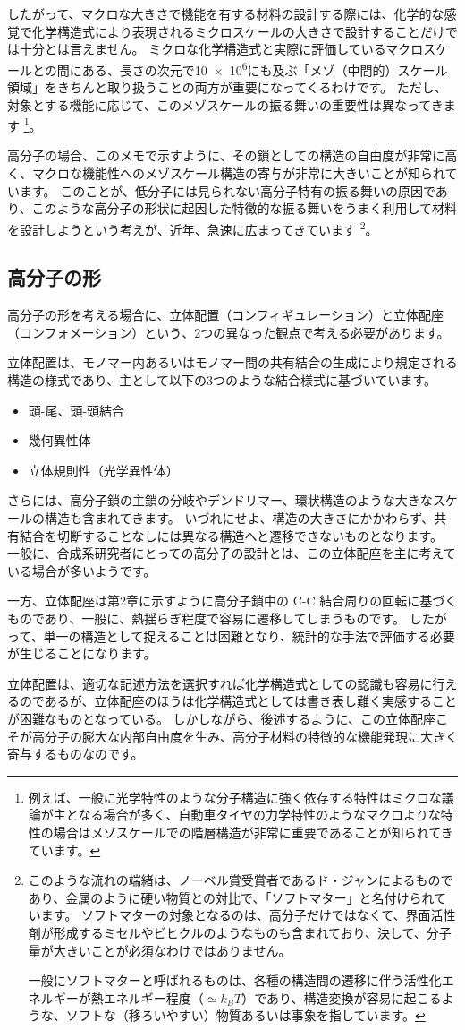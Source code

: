 \documentclass[a4paper,11pt]{jlreq}
\begin{document}
したがって、マクロな大きさで機能を有する材料の設計する際には、化学的な感覚で化学構造式により表現されるミクロスケールの大きさで設計することだけでは十分とは言えません。
ミクロな化学構造式と実際に評価しているマクロスケールとの間にある、長さの次元で\num{10e6}にも及ぶ「メゾ（中間的）スケール領域」をきちんと取り扱うことの両方が重要になってくるわけです。
ただし、対象とする機能に応じて、このメゾスケールの振る舞いの重要性は異なってきます
\footnote
{
例えば、一般に光学特性のような分子構造に強く依存する特性はミクロな議論が主となる場合が多く、自動車タイヤの力学特性のようなマクロよりな特性の場合はメゾスケールでの階層構造が非常に重要であることが知られてきています。
}。

高分子の場合、このメモで示すように、その鎖としての構造の自由度が非常に高く、マクロな機能性へのメゾスケール構造の寄与が非常に大きいことが知られています。
このことが、低分子には見られない高分子特有の振る舞いの原因であり、このような高分子の形状に起因した特徴的な振る舞いをうまく利用して材料を設計しようという考えが、近年、急速に広まってきています
\footnote
{
このような流れの端緒は、ノーベル賞受賞者であるド・ジャンによるものであり、金属のように硬い物質との対比で、「ソフトマター」と名付けられています。
ソフトマターの対象となるのは、高分子だけではなくて、界面活性剤が形成するミセルやビヒクルのようなものも含まれており、決して、分子量が大きいことが必須なわけではありません。

一般にソフトマターと呼ばれるものは、各種の構造間の遷移に伴う活性化エネルギーが熱エネルギー程度（$\simeq k_B T$）であり、構造変換が容易に起こるような、ソフトな（移ろいやすい）物質あるいは事象を指しています。
}。
\subsection{高分子の形}

高分子の形を考える場合に、立体配置（コンフィギュレーション）と立体配座（コンフォメーション）という、2つの異なった観点で考える必要があります。

立体配置は、モノマー内あるいはモノマー間の共有結合の生成により規定される構造の様式であり、主として以下の3つのような結合様式に基づいています。
\begin{itemize}
\item 
頭-尾、頭-頭結合
\item
幾何異性体
\item
立体規則性（光学異性体）
\end{itemize}
さらには、高分子鎖の主鎖の分岐やデンドリマー、環状構造のような大きなスケールの構造も含まれてきます。
いづれにせよ、構造の大きさにかかわらず、共有結合を切断することなしには異なる構造へと遷移できないものとなります。
一般に、合成系研究者にとっての高分子の設計とは、この立体配座を主に考えている場合が多いようです。

一方、立体配座は第2章に示すように高分子鎖中の C-C 結合周りの回転に基づくものであり、一般に、熱揺らぎ程度で容易に遷移してしまうものです。
したがって、単一の構造として捉えることは困難となり、統計的な手法で評価する必要が生じることになります。

立体配置は、適切な記述方法を選択すれば化学構造式としての認識も容易に行えるのであるが、立体配座のほうは化学構造式としては書き表し難く実感することが困難なものとなっている。
しかしながら、後述するように、この立体配座こそが高分子の膨大な内部自由度を生み、高分子材料の特徴的な機能発現に大きく寄与するものなのです。
\end{document}
